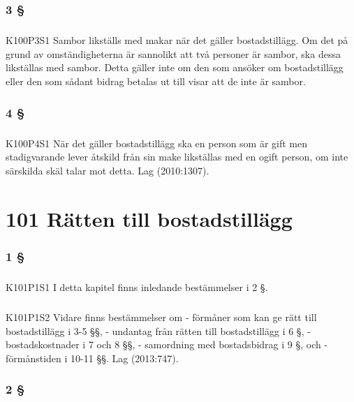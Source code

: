 \documentclass[a4paper,notitlepage,openany,10pt]{book}
\begin{document}
\subsection*{3 §}
\paragraph*{}
{\tiny K100P3S1}
Sambor likställs med makar när det gäller bostadstillägg.
Om det på grund av omständigheterna är sannolikt att två personer är sambor, ska dessa likställas med sambor. Detta gäller inte om den som ansöker om bostadstillägg eller den som sådant bidrag betalas ut till visar att de inte är sambor.
\subsection*{4 §}
\paragraph*{}
{\tiny K100P4S1}
När det gäller bostadstillägg ska en person som är gift men stadigvarande lever åtskild från sin make likställas med en ogift person, om inte särskilda skäl talar mot detta.
Lag (2010:1307).
\chapter*{101 Rätten till bostadstillägg}
\subsection*{1 §}
\paragraph*{}
{\tiny K101P1S1}
I detta kapitel finns inledande bestämmelser i 2 §.
\paragraph*{}
{\tiny K101P1S2}
Vidare finns bestämmelser om
\newline - förmåner som kan ge rätt till bostadstillägg i 3-5 §§,
\newline - undantag från rätten till bostadstillägg i 6 §,
\newline - bostadskostnader i 7 och 8 §§,
\newline - samordning med bostadsbidrag i 9 §, och
\newline - förmånstiden i 10-11 §§.
Lag (2013:747).
\subsection*{2 §}
\end{document}
